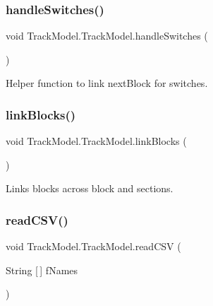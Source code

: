 \subsubsection{\texorpdfstring{handle\+Switches()}{handleSwitches()}}
{\footnotesize\ttfamily void Track\+Model.\+Track\+Model.\+handle\+Switches (\begin{DoxyParamCaption}{ }\end{DoxyParamCaption})\hspace{0.3cm}{\ttfamily [private]}}



Helper function to link next\+Block for switches. 

\mbox{\label{classTrackModel_1_1TrackModel_a8a320bcb2c2272eb52e05a022f6d4a9c}} 
\subsubsection{\texorpdfstring{link\+Blocks()}{linkBlocks()}}
{\footnotesize\ttfamily void Track\+Model.\+Track\+Model.\+link\+Blocks (\begin{DoxyParamCaption}{ }\end{DoxyParamCaption})\hspace{0.3cm}{\ttfamily [private]}}



Links blocks across block and sections. 

\mbox{\label{classTrackModel_1_1TrackModel_ab4deefd42535c2e06785eba4ed3989a1}} 
\subsubsection{\texorpdfstring{read\+C\+S\+V()}{readCSV()}}
{\footnotesize\ttfamily void Track\+Model.\+Track\+Model.\+read\+C\+SV (\begin{DoxyParamCaption}\item[{String \mbox{[}$\,$\mbox{]}}]{f\+Names }\end{DoxyParamCaption})}



